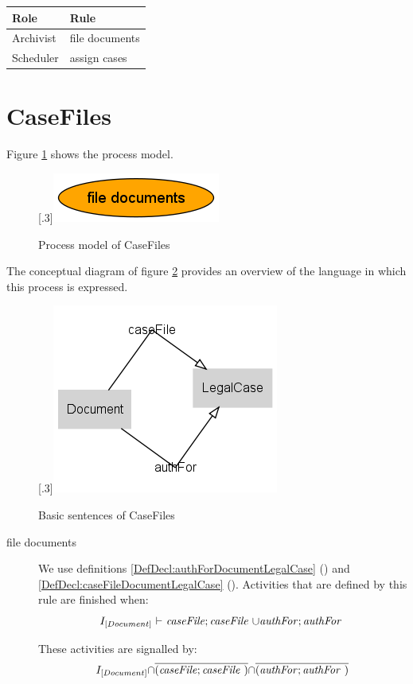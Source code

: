 \documentclass[10pt,a4paper]{report}              %
\theoremstyle{plain}\theorembodyfont{\rmfamily}\newtheorem{definition}{Definition}[section]
\theoremstyle{plain}\theorembodyfont{\rmfamily}\newtheorem{designrule}[definition]{Requirement}
\def\id#1{\mbox{\em #1\/}}
\newcommand{\cmpl}[1]{\overline{#1}}
\begin{document}
\begin{tabular}{|l|l|}\hline
Role&Rule\\ \hline
Archivist & file documents\\ \hline
   Scheduler & assign cases\\ \hline
\end{tabular}

\section{CaseFiles}

Figure \ref{fig:ProcCaseFiles} shows the process model.

\begin{figure}[htb]
\begin{center}
\scalebox{.3}[.3]{\includegraphics{ProcCaseFiles}}
\caption{Process model of CaseFiles}
\label{fig:ProcCaseFiles}
\end{center}
\end{figure}
The conceptual diagram of figure \ref{fig:PLCaseFiles} provides an overview of the language in which this process is expressed.

\begin{figure}[htb]
\begin{center}
\scalebox{.3}[.3]{\includegraphics{PLCaseFiles}}
\caption{Basic sentences of CaseFiles}
\label{fig:PLCaseFiles}
\end{center}
\end{figure}
\begin{description}
\item[file documents]
We use definitions \ref{DefDecl:authForDocumentLegalCase} ({}) and \ref{DefDecl:caseFileDocumentLegalCase} ({}). 
Activities that are defined by this rule are finished when: 
\begin{equation}
   I_{[Document]}\ {\vdash}\ {\id{caseFile}};{\id{caseFile}}~{\cup}{\id{authFor}};{\id{authFor}}~\label{DefRule:file documents}
\end{equation}

 These activities are signalled by:
\begin{equation}
   I_{[Document]}{\cap}\cmpl{({\id{caseFile}};{\id{caseFile}}~)}{\cap}\cmpl{({\id{authFor}};{\id{authFor}}~)}\label{DefRule:file documents}
\end{equation}

\end{description}
\end{document}

